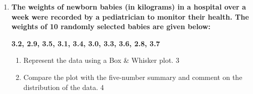 \documentclass[a4paper,oneside]{book}
\begin{document}
\begin{enumerate}
  \item
\textbf{The weights of newborn babies (in kilograms) in a hospital over a week were recorded by a pediatrician to monitor their health. The weights of 10 randomly selected babies are given below:}

\begin{center}
\textbf{3.2, 2.9, 3.5, 3.1, 3.4, 3.0, 3.3, 3.6, 2.8, 3.7}
\end{center}

\begin{enumerate}
    \item  
    Represent the data using a Box \& Whisker plot. \hfill 3
    \item
    Compare the plot with the five-number summary and comment on the distribution of the data. \hfill 4
\end{enumerate}


\end{enumerate}
\end{document}
